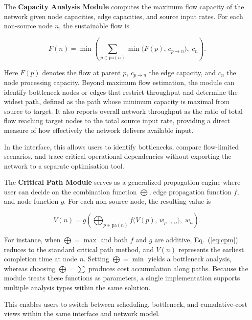\documentclass[twocolumn]{rps-esrel2026}
\begin{document}
The \textbf{Capacity Analysis Module} computes the maximum flow capacity of the network given node capacities, edge capacities, and source input rates. For each non-source node $n$, the sustainable flow is

\begin{equation}\label{eq:maxflow}
F(n) = \min\!\left(\sum_{p \in \mathrm{pa}(n)}
\min\bigl(F(p),\, c_{p \to n}\bigr),\; c_n\right).
\end{equation}

Here $F(p)$ denotes the flow at parent $p$, $c_{p \to n}$ the edge capacity, and $c_n$ the node processing capacity. Beyond maximum flow estimation, the module can identify bottleneck nodes or edges that restrict throughput and determine the widest path, defined as the path whose minimum capacity is maximal from source to target. It also reports overall network throughput as the ratio of total flow reaching target nodes to the total source input rate, providing a direct measure of how effectively the network delivers available input. 

In the interface, this allows users to identify bottlenecks, compare flow-limited scenarios, and trace critical operational dependencies without exporting the network to a separate optimisation tool.

The \textbf{Critical Path Module} serves as a generalized propagation engine where user can decide on the combination function $\bigoplus$,  edge propagation function $f$, and node function $g$. For each non-source node, the resulting value is

\begin{equation}\label{eq:cpm}
V(n) = g\!\left(\bigoplus_{p \in \mathrm{pa}(n)} f\bigl(V(p),\, w_{p \to n}\bigr),\; w_n\right).
\end{equation}

For instance, when $\bigoplus = \max$ and both $f$ and $g$ are additive, Eq.~(\ref{eq:cpm}) reduces to the standard critical path method, and $V(n)$ represents the earliest completion time at node $n$. Setting $\bigoplus = \min$ yields a bottleneck analysis, whereas choosing $\bigoplus = \sum$ produces cost accumulation along paths. Because the module treats these functions as parameters, a single implementation supports multiple analysis types within the same solution.

This enables users to switch between scheduling, bottleneck, and cumulative-cost views within the same interface and network model.
\end{document}
